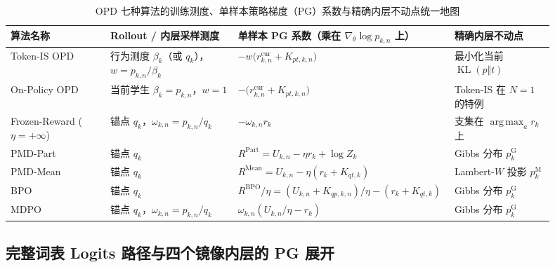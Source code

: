 \documentclass[lang=cn,scheme=chinese,openany]{elegantbook}
\newcommand{\KL}{\operatorname{KL}}
\DeclareMathOperator*{\argmax}{arg\,max}
\begin{document}
\begin{table}[ht]
\centering
\caption{OPD 七种算法的训练测度、单样本策略梯度（PG）系数与精确内层不动点统一地图}
\label{tab:ch2-opd-baseline-map}
\label{tab:ch2-opd-seven-algorithms}
\begin{tabular}{>{\raggedright\arraybackslash}p{0.18\linewidth}>{\raggedright\arraybackslash}p{0.23\linewidth}>{\raggedright\arraybackslash}p{0.31\linewidth}>{\raggedright\arraybackslash}p{0.18\linewidth}}
\toprule
算法名称 & Rollout / 内层采样测度 & 单样本 PG 系数（乘在 $\nabla_\theta\log p_{k,n}$ 上） & 精确内层不动点 \\
\midrule
Token-IS OPD & 行为测度 $\beta_k$（或 $q_k$），$w=p_{k,n}/\beta_k$ & $-w\bigl(r_{k,n}^{\mathrm{cur}}+K_{pt,k,n}\bigr)$ & 最小化当前 $\KL(p\Vert t)$ \\
On-Policy OPD & 当前学生 $\beta_k=p_{k,n}$，$w=1$ & $-\bigl(r_{k,n}^{\mathrm{cur}}+K_{pt,k,n}\bigr)$ & Token-IS 在 $N=1$ 的特例 \\
Frozen-Reward ($\eta=+\infty$) & 锚点 $q_k$，$\omega_{k,n}=p_{k,n}/q_k$ & $-\omega_{k,n} r_k$ & 支集在 $\argmax_a r_k$ 上 \\
PMD-Part & 锚点 $q_k$ & $R^{\mathrm{Part}}=U_{k,n}-\eta r_k+\log Z_k$ & Gibbs 分布 $p_k^{\mathrm G}$ \\
PMD-Mean & 锚点 $q_k$ & $R^{\mathrm{Mean}}=U_{k,n}-\eta(r_k+K_{qt,k})$ & Lambert-$W$ 投影 $p_k^{\mathrm M}$ \\
BPO & 锚点 $q_k$ & $R^{\mathrm{BPO}}/\eta=(U_{k,n}+K_{qp,k,n})/\eta-(r_k+K_{qt,k})$ & Gibbs 分布 $p_k^{\mathrm G}$ \\
MDPO & 锚点 $q_k$，$\omega_{k,n}=p_{k,n}/q_k$ & $\omega_{k,n}(U_{k,n}/\eta-r_k)$ & Gibbs 分布 $p_k^{\mathrm G}$ \\
\bottomrule
\end{tabular}
\end{table}

\subsection{完整词表 Logits 路径与四个镜像内层的 PG 展开}
\label{sec:ch2-opd-full-vocab}
\label{subsec:ch2-opd-four-inner-pg}
\end{document}
